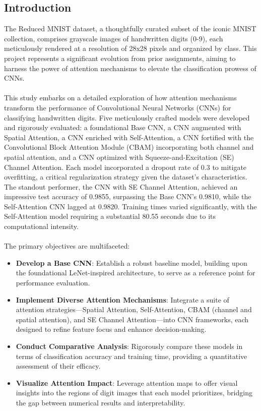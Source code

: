 \documentclass[12pt]{article}
\begin{document}
\subsection{Introduction}
The Reduced MNIST dataset, a thoughtfully curated subset of the iconic MNIST collection, comprises grayscale images of handwritten digits (0-9), each meticulously rendered at a resolution of 28x28 pixels and organized by class. This project represents a significant evolution from prior assignments, aiming to harness the power of attention mechanisms to elevate the classification prowess of CNNs. \\
\\
This study embarks on a detailed exploration of how attention mechanisms transform the performance of Convolutional Neural Networks (CNNs) for classifying handwritten digits. Five meticulously crafted models were developed and rigorously evaluated: a foundational Base CNN, a CNN augmented with Spatial Attention, a CNN enriched with Self-Attention, a CNN fortified with the Convolutional Block Attention Module (CBAM) incorporating both channel and spatial attention, and a CNN optimized with Squeeze-and-Excitation (SE) Channel Attention. Each model incorporated a dropout rate of 0.3 to mitigate overfitting, a critical regularization strategy given the dataset's characteristics. The standout performer, the CNN with SE Channel Attention, achieved an impressive test accuracy of 0.9855, surpassing the Base CNN's 0.9810, while the Self-Attention CNN lagged at 0.9820. Training times varied significantly, with the Self-Attention model requiring a substantial 80.55 seconds due to its computational intensity.\\
\\
The primary objectives are multifaceted:
\begin{itemize}
    \item \textbf{Develop a Base CNN}: Establish a robust baseline model, building upon the foundational LeNet-inspired architecture, to serve as a reference point for performance evaluation.
    \item \textbf{Implement Diverse Attention Mechanisms}: Integrate a suite of attention strategies—Spatial Attention, Self-Attention, CBAM (channel and spatial attention), and SE Channel Attention—into CNN frameworks, each designed to refine feature focus and enhance decision-making.
    \item \textbf{Conduct Comparative Analysis}: Rigorously compare these models in terms of classification accuracy and training time, providing a quantitative assessment of their efficacy.
    \item \textbf{Visualize Attention Impact}: Leverage attention maps to offer visual insights into the regions of digit images that each model prioritizes, bridging the gap between numerical results and interpretability.\\
\end{itemize}
\end{document}
